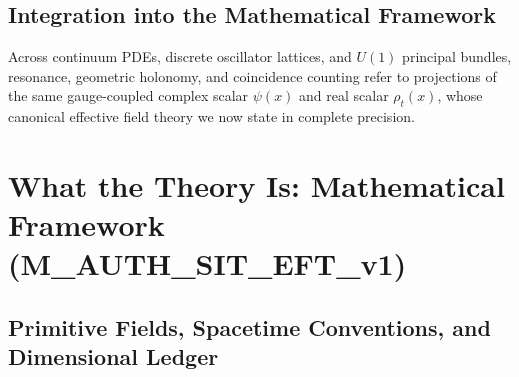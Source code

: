 \documentclass[american,11pt,letterpaper]{article}
\def\texttt#1{#1}%
\begin{document}
\subsection{Integration into the Mathematical Framework}

Across continuum PDEs, discrete oscillator lattices, and $U(1)$ principal bundles, resonance, geometric holonomy, and coincidence counting refer to projections of the same gauge-coupled complex scalar $\psi(x)$ and real scalar $\rho_t(x)$, whose canonical effective field theory we now state in complete precision.

\section{What the Theory Is: Mathematical Framework (\texttt{M\_AUTH\_SIT\_EFT\_v1})}
\label{sec:framework}
\label{sec:quantitative-coupling}

\subsection{Primitive Fields, Spacetime Conventions, and Dimensional Ledger}
\end{document}
